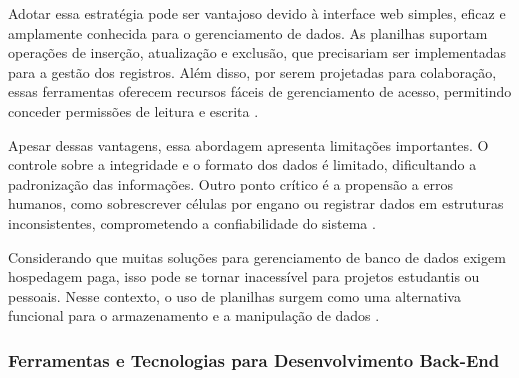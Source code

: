 Adotar essa estratégia pode ser vantajoso devido à interface web simples, eficaz e amplamente conhecida para o gerenciamento de dados. As planilhas suportam operações de inserção, atualização e exclusão, que precisariam ser implementadas para a gestão dos registros. Além disso, por serem projetadas para colaboração, essas ferramentas oferecem recursos fáceis de gerenciamento de acesso, permitindo conceder permissões de leitura e escrita \cite{schwertnercharao:hal-02119998}.

Apesar dessas vantagens, essa abordagem apresenta limitações importantes. O controle sobre a integridade e o formato dos dados é limitado, dificultando a padronização das informações. Outro ponto crítico é a propensão a erros humanos, como sobrescrever células por engano ou registrar dados em estruturas inconsistentes, comprometendo a confiabilidade do sistema \cite{wisconsin2020}.

Considerando que muitas soluções para gerenciamento de banco de dados exigem hospedagem paga, isso pode se tornar inacessível para projetos estudantis ou pessoais. Nesse contexto, o uso de planilhas surgem como uma alternativa funcional para o armazenamento e a manipulação de dados \cite{ufsm2024}.

\subsubsection{Ferramentas e Tecnologias para Desenvolvimento Back-End}

